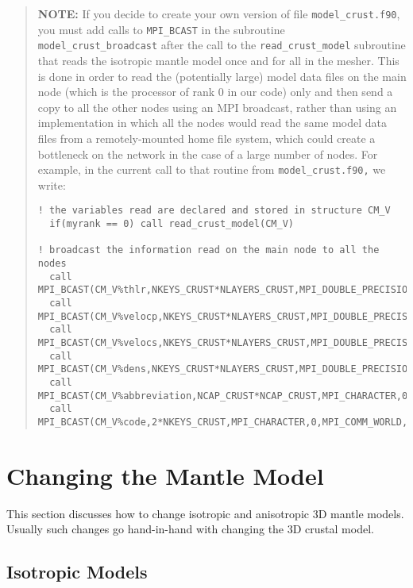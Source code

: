 \begin{quote}
\textbf{NOTE:} If you decide to create your own version of file \texttt{model\_crust.f90},
you must add calls to \texttt{MPI\_BCAST} in the subroutine \texttt{model\_crust\_broadcast}
after the call to the \texttt{read\_crust\_model} subroutine that
reads the isotropic mantle model once and for all in the mesher. This
is done in order to read the (potentially large) model data files
on the main node (which is the processor of rank 0 in our code)
only and then send a copy to all the other nodes using an MPI broadcast,
rather than using an implementation in which all the nodes would read
the same model data files from a remotely-mounted home file system,
which could create a bottleneck on the network in the case of a large
number of nodes. For example, in the current call to that routine
from \texttt{model\_crust.f90,} we write:

{\footnotesize
\begin{verbatim}
! the variables read are declared and stored in structure CM_V
  if(myrank == 0) call read_crust_model(CM_V)

! broadcast the information read on the main node to all the nodes
  call MPI_BCAST(CM_V%thlr,NKEYS_CRUST*NLAYERS_CRUST,MPI_DOUBLE_PRECISION,0,MPI_COMM_WORLD,ier)
  call MPI_BCAST(CM_V%velocp,NKEYS_CRUST*NLAYERS_CRUST,MPI_DOUBLE_PRECISION,0,MPI_COMM_WORLD,ier)
  call MPI_BCAST(CM_V%velocs,NKEYS_CRUST*NLAYERS_CRUST,MPI_DOUBLE_PRECISION,0,MPI_COMM_WORLD,ier)
  call MPI_BCAST(CM_V%dens,NKEYS_CRUST*NLAYERS_CRUST,MPI_DOUBLE_PRECISION,0,MPI_COMM_WORLD,ier)
  call MPI_BCAST(CM_V%abbreviation,NCAP_CRUST*NCAP_CRUST,MPI_CHARACTER,0,MPI_COMM_WORLD,ier)
  call MPI_BCAST(CM_V%code,2*NKEYS_CRUST,MPI_CHARACTER,0,MPI_COMM_WORLD,ier)
\end{verbatim}
}
\end{quote}

\section{Changing the Mantle Model}\label{sec:Changing-the-Mantle}

This section discusses how to change isotropic and anisotropic 3D
mantle models. Usually such changes go hand-in-hand with changing
the 3D crustal model.


\subsection{Isotropic Models}\label{sub:Isotropic-Models}

